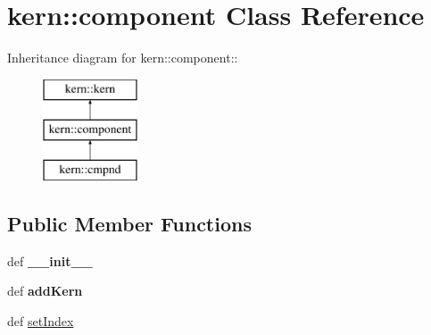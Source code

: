 \hypertarget{classkern_1_1component}{
\section{kern::component Class Reference}
\label{classkern_1_1component}
}
Inheritance diagram for kern::component::\begin{figure}[H]
\begin{center}
\leavevmode
\includegraphics[height=3cm]{classkern_1_1component}
\end{center}
\end{figure}
\subsection*{Public Member Functions}
\begin{CompactItemize}
\item 
\hypertarget{classkern_1_1component_747cbef8e2ac580ae8f43c07889dc382}{
def \textbf{\_\-\_\-init\_\-\_\-}}
\label{classkern_1_1component_747cbef8e2ac580ae8f43c07889dc382}

\item 
\hypertarget{classkern_1_1component_0501a814946c2f941746a2341517bff6}{
def \textbf{addKern}}
\label{classkern_1_1component_0501a814946c2f941746a2341517bff6}

\item 
def \hyperlink{classkern_1_1component_120031427476d451ac010d51833f37e3}{setIndex}
\end{CompactItemize}
